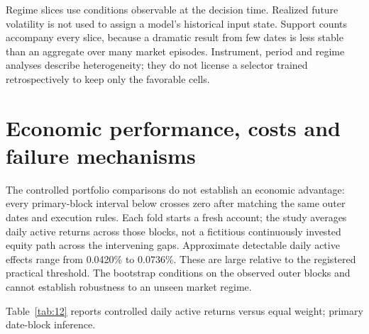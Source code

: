 \documentclass[11pt,a4paper]{article}
\begin{document}
Regime slices use conditions observable at the decision time. Realized future volatility is not used to assign a model's historical input state. Support counts accompany every slice, because a dramatic result from few dates is less stable than an aggregate over many market episodes. Instrument, period and regime analyses describe heterogeneity; they do not license a selector trained retrospectively to keep only the favorable cells.


\section{Economic performance, costs and failure mechanisms}\label{sec:section-08}

The controlled portfolio comparisons do not establish an economic advantage: every primary-block interval below crosses zero after matching the same outer dates and execution rules. Each fold starts a fresh account; the study averages daily active returns across those blocks, not a fictitious continuously invested equity path across the intervening gaps. Approximate detectable daily active effects range from 0.0420\% to 0.0736\%. These are large relative to the registered practical threshold. The bootstrap conditions on the observed outer blocks and cannot establish robustness to an unseen market regime.

\noindent Table~\ref{tab:12} reports controlled daily active returns versus equal weight; primary date-block inference.
\end{document}
